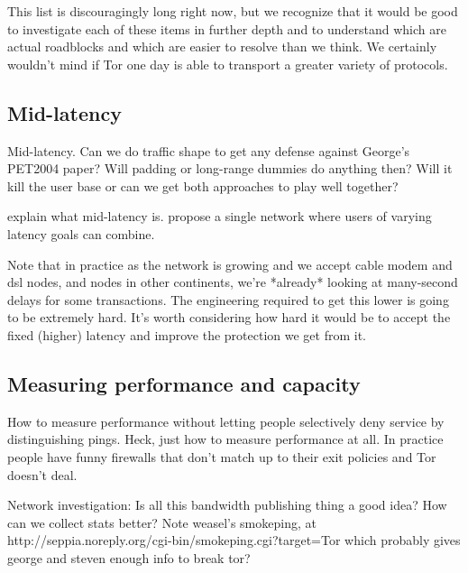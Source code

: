 \documentclass{llncs}
\begin{document}
This list is discouragingly long right now, but we recognize that it
would be good to investigate each of these items in further depth and to
understand which are actual roadblocks and which are easier to resolve
than we think. We certainly wouldn't mind if Tor one day is able to
transport a greater variety of protocols.

\subsection{Mid-latency}

Mid-latency. Can we do traffic shape to get any defense against George's
PET2004 paper? Will padding or long-range dummies do anything then? Will
it kill the user base or can we get both approaches to play well together?

explain what mid-latency is. propose a single network where users of
varying latency goals can combine.

Note that in practice as the network is growing and we accept cable
modem and dsl nodes, and nodes in other continents, we're *already*
looking at many-second delays for some transactions. The engineering
required to get this lower is going to be extremely hard. It's worth
considering how hard it would be to accept the fixed (higher) latency
and improve the protection we get from it.



\subsection{Measuring performance and capacity}

How to measure performance without letting people selectively deny service
by distinguishing pings. Heck, just how to measure performance at all. In
practice people have funny firewalls that don't match up to their exit
policies and Tor doesn't deal.

Network investigation: Is all this bandwidth publishing thing a good idea?
How can we collect stats better? Note weasel's smokeping, at
http://seppia.noreply.org/cgi-bin/smokeping.cgi?target=Tor
which probably gives george and steven enough info to break tor?
\end{document}
